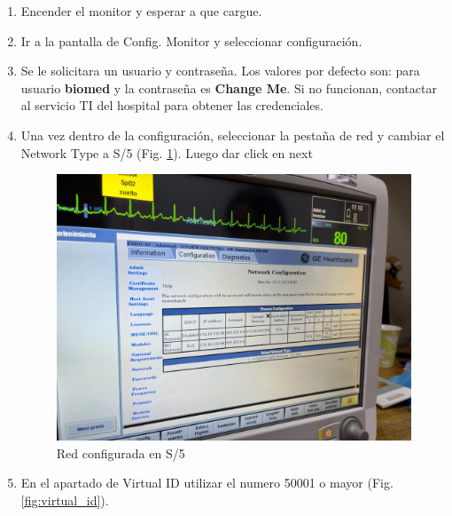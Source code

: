 \documentclass{article}
\begin{document}
\begin{enumerate}
	\item Encender el monitor y esperar a que cargue.
	\item Ir a la pantalla de Config. Monitor y seleccionar configuración. 
	\item Se le solicitara un usuario y contraseña. Los valores por defecto son: para usuario \textbf{biomed} y la contraseña es \textbf{Change Me}. Si no funcionan, contactar al servicio TI del hospital para obtener las credenciales.
	\item Una vez dentro de la configuración, seleccionar la pestaña de red y cambiar el Network Type a S/5 (Fig. \ref{fig:network_type}). Luego dar click en next
	
	\begin{figure}[h]
		\centering
		\includegraphics[scale=0.3]{img/network.png}
		\caption{Red configurada en S/5}
		\label{fig:network_type}
	\end{figure}

	\item En el apartado de Virtual ID utilizar el numero 50001 o mayor (Fig. \ref{fig:virtual_id}). 
	

\end{enumerate}
\end{document}
